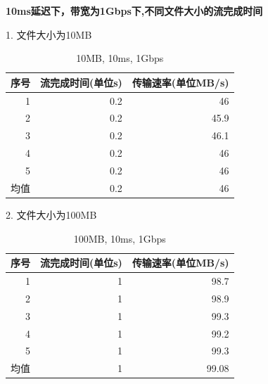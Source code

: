 \documentclass[11pt]{article}
\begin{document}
\textbf{10ms延迟下，带宽为1Gbps下,不同文件大小的流完成时间}

1. 文件大小为10MB
\begin{table}[htbp]
  \centering
  \caption{10MB, 10ms, 1Gbps}
    \begin{tabular}{|l|r|r|}
    \hline
    序号    & \multicolumn{1}{l|}{流完成时间(单位s)} & \multicolumn{1}{l|}{传输速率(单位MB/s)} \bigstrut\\
    \hline
    \multicolumn{1}{|r|}{1} & 0.2   & 46 \bigstrut\\
    \hline
    \multicolumn{1}{|r|}{2} & 0.2   & 45.9 \bigstrut\\
    \hline
    \multicolumn{1}{|r|}{3} & 0.2   & 46.1 \bigstrut\\
    \hline
    \multicolumn{1}{|r|}{4} & 0.2   & 46 \bigstrut\\
    \hline
    \multicolumn{1}{|r|}{5} & 0.2   & 46 \bigstrut\\
    \hline
    均值    & 0.2   & 46 \bigstrut\\
    \hline
    \end{tabular}%
  
\end{table}%




2. 文件大小为100MB

\begin{table}[htbp]
  \centering
  \caption{100MB, 10ms, 1Gbps}
    \begin{tabular}{|l|r|r|}
    \hline
    序号    & \multicolumn{1}{l|}{流完成时间(单位s)} & \multicolumn{1}{l|}{传输速率(单位MB/s)} \bigstrut\\
    \hline
    \multicolumn{1}{|r|}{1} & 1     & 98.7 \bigstrut\\
    \hline
    \multicolumn{1}{|r|}{2} & 1     & 98.9 \bigstrut\\
    \hline
    \multicolumn{1}{|r|}{3} & 1     & 99.3 \bigstrut\\
    \hline
    \multicolumn{1}{|r|}{4} & 1     & 99.2 \bigstrut\\
    \hline
    \multicolumn{1}{|r|}{5} & 1     & 99.3 \bigstrut\\
    \hline
    均值    & 1     & 99.08 \bigstrut\\
    \hline
    \end{tabular}%
  
\end{table}%
\end{document}
